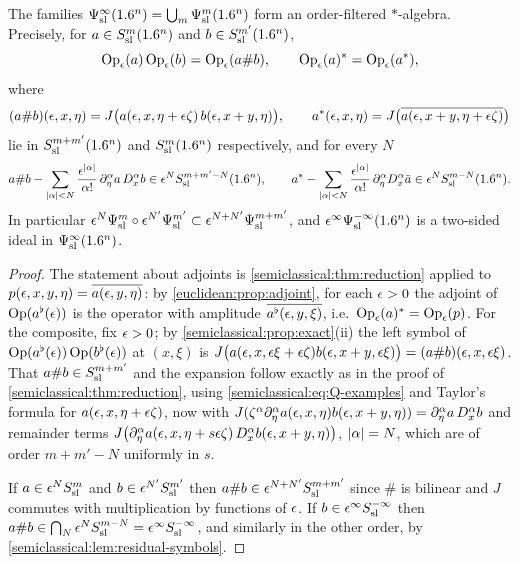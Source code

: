 \begin{theorem}\label{semiclassical:thm:composition}
  The families $\Psi^{\infty}_{\mathrm{sl}}(1.6^n)=\bigcup_m\Psi^{m}_{\mathrm{sl}}(1.6^n)$ form an
  order-filtered $*$-algebra. Precisely, for $a\in S^{m}_{\mathrm{sl}}(1.6^n)$ and
  $b\in S^{m'}_{\mathrm{sl}}(1.6^n)$,
  \begin{equation*}
    \operatorname{Op}_\epsilon(a)\operatorname{Op}_\epsilon(b)=\operatorname{Op}_\epsilon(a\#b),\qquad \operatorname{Op}_\epsilon(a)^*=\operatorname{Op}_\epsilon(a^*),
  \end{equation*}
  where
  \begin{equation*}
    (a\#b)(\epsilon,x,\eta)=J\bigl(a(\epsilon,x,\eta+\epsilon\zeta)\,b(\epsilon,x+y,\eta)\bigr),\qquad
    a^*(\epsilon,x,\eta)=J\bigl(\overline{a(\epsilon,x+y,\eta+\epsilon\zeta)}\bigr)
  \end{equation*}
  lie in $S^{m+m'}_{\mathrm{sl}}(1.6^n)$ and $S^{m}_{\mathrm{sl}}(1.6^n)$ respectively, and for every $N$
  \begin{equation}\label{semiclassical:eq:composition}
    a\#b-\sum_{\lvert \alpha\rvert<N}\frac{\epsilon^{\lvert \alpha\rvert}}{\alpha!}\,\partial^\alpha_\eta a\,D^\alpha_xb
    \in\epsilon^NS^{m+m'-N}_{\mathrm{sl}}(1.6^n),\qquad
    a^*-\sum_{\lvert \alpha\rvert<N}\frac{\epsilon^{\lvert \alpha\rvert}}{\alpha!}\,\partial^\alpha_\eta D^\alpha_x\bar a
    \in\epsilon^NS^{m-N}_{\mathrm{sl}}(1.6^n).
  \end{equation}
  In particular $\epsilon^N\Psi^{m}_{\mathrm{sl}}\circ\epsilon^{N'}\Psi^{m'}_{\mathrm{sl}}\subset\epsilon^{N+N'}\Psi^{m+m'}_{\mathrm{sl}}$,
  and $\epsilon^\infty\Psi^{-\infty}_{\mathrm{sl}}(1.6^n)$ is a two-sided ideal in $\Psi^{\infty}_{\mathrm{sl}}(1.6^n)$.
\end{theorem}
\begin{proof}
  The statement about adjoints is \cref{semiclassical:thm:reduction} applied
  to $p(\epsilon,x,y,\eta)=\overline{a(\epsilon,y,\eta)}$: by
  \cref{euclidean:prop:adjoint}, for each $\epsilon>0$ the adjoint of $\operatorname{Op}(a^\flat(\epsilon))$ is
  the operator with amplitude $\overline{a^\flat(\epsilon,y,\xi)}$, i.e.\
  $\operatorname{Op}_\epsilon(a)^*=\operatorname{Op}_\epsilon(p)$. For the composite, fix $\epsilon>0$; by
  \cref{semiclassical:prop:exact}(ii) the left symbol of
  $\operatorname{Op}(a^\flat(\epsilon))\operatorname{Op}(b^\flat(\epsilon))$ at $(x,\xi)$ is
  $J\bigl(a(\epsilon,x,\epsilon\xi+\epsilon\zeta)b(\epsilon,x+y,\epsilon\xi)\bigr)=(a\#b)(\epsilon,x,\epsilon\xi)$.
  That $a\#b\in S^{m+m'}_{\mathrm{sl}}$ and the expansion follow exactly as in the proof of
  \cref{semiclassical:thm:reduction}, using
  \eqref{semiclassical:eq:Q-examples} and Taylor's formula for
  $a(\epsilon,x,\eta+\epsilon\zeta)$, now with
  $J(\zeta^\alpha\partial^\alpha_\eta a(\epsilon,x,\eta)b(\epsilon,x+y,\eta))=\partial^\alpha_\eta a\,D^\alpha_xb$
  and remainder terms
  $J\bigl(\partial^\alpha_\eta a(\epsilon,x,\eta+s\epsilon\zeta)\,D^\alpha_xb(\epsilon,x+y,\eta)\bigr)$,
  $\lvert \alpha\rvert=N$, which are of order $m+m'-N$ uniformly in $s$.

  If $a\in\epsilon^NS^{m}_{\mathrm{sl}}$ and $b\in\epsilon^{N'}S^{m'}_{\mathrm{sl}}$ then $a\#b\in\epsilon^{N+N'}S^{m+m'}_{\mathrm{sl}}$
  since $\#$ is bilinear and $J$ commutes with multiplication by functions of
  $\epsilon$. If $b\in\epsilon^\infty S^{-\infty}_{\mathrm{sl}}$ then $a\#b\in\bigcap_N\epsilon^NS^{m-N}_{\mathrm{sl}}=
  \epsilon^\infty S^{-\infty}_{\mathrm{sl}}$, and similarly in the other order, by
  \cref{semiclassical:lem:residual-symbols}.
\end{proof}

